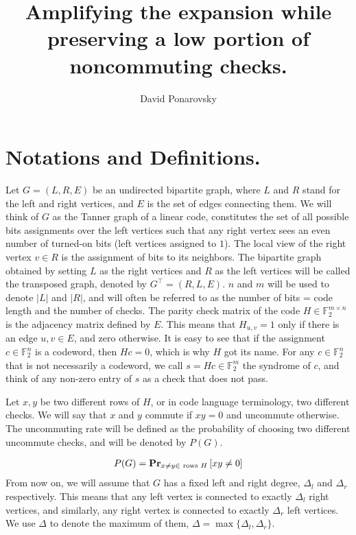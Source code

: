 \documentclass[manuscript,screen,review]{acmart}
\begin{document}

\title{ Amplifying the expansion while preserving a low portion of noncommuting checks. }
\author{David Ponarovsky}
\maketitle

\section{Notations and Definitions.}
Let $G=(L,R,E)$ be an undirected bipartite graph, where $L$ and $R$ stand for the left and right vertices, and $E$ is the set of edges connecting them. We will think of $G$ as the Tanner graph of a linear code, constitutes the set of all possible bits assignments over the left vertices such that any right vertex sees an even number of turned-on bits (left vertices assigned to $1$). The local view of the right vertex $v \in R$ is the assignment of bits to its neighbors. The bipartite graph obtained by setting $L$ as the right vertices and $R$ as the left vertices will be called the transposed graph, denoted by $G^{\top} = (R,L,E)$. $n$ and $m$ will be used to denote $|L|$ and $|R|$, and will often be referred to as the number of bits = code length and the number of checks.
The parity check matrix of the code $H \in \mathbb{F}_2^{m \times n}$ is the adjacency matrix defined by $E$. This means that $H_{u,v} = 1$ only if there is an edge ${u,v} \in E$, and zero otherwise. It is easy to see that if the assignment $c \in \mathbb{F}_{2}^{n}$ is a codeword, then $Hc = 0$, which is why $H$ got its name. For any $c \in \mathbb{F}_{2}^{n}$ that is not necessarily a codeword, we call $s = Hc \in \mathbb{F}_{2}^{m}$ the syndrome of $c$, and think of any non-zero entry of $s$ as a check that does not pass.

Let $x,y$ be two different rows of $H$, or in code language terminology, two different checks. We will say that $x$ and $y$ commute if $xy = 0$ and uncommute otherwise. The uncommuting rate will be defined as the probability of choosing two different uncommute checks, and will be denoted by $P(G)$.

\begin{equation*}
  \begin{split}
    P(G) =  \prbm{ xy \neq 0 }{x\neq y \in \text{ rows } H } 
  \end{split}
\end{equation*}
From now on, we will assume that $G$ has a fixed left and right degree, $\Delta_{l}$ and $\Delta_{r}$ respectively. This means that any left vertex is connected to exactly $\Delta_{l}$ right vertices, and similarly, any right vertex is connected to exactly $\Delta_{r}$ left vertices. We use $\Delta$ to denote the maximum of them, $\Delta = \max \{ \Delta_{l}, \Delta_{r} \}$. 
\end{document}
